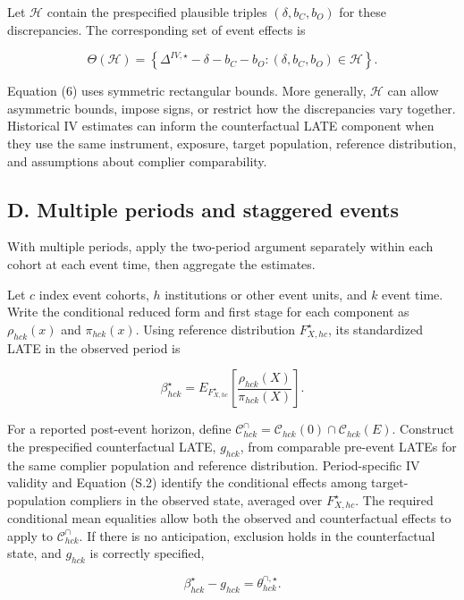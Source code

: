 \documentclass[
  11pt,
]{article}
\begin{document}
Let \(\mathcal H\) contain the prespecified plausible triples
\((\delta,b_C,b_O)\) for these discrepancies. The corresponding set of
event effects is

\[
\Theta(\mathcal H)
=\left\{
\Delta^{IV,\star}-\delta-b_C-b_O:
(\delta,b_C,b_O)\in\mathcal H
\right\}.
\tag{S.9}
\]

Equation (6) uses symmetric rectangular bounds. More generally,
\(\mathcal H\) can allow asymmetric bounds, impose signs, or restrict
how the discrepancies vary together. Historical IV estimates can inform
the counterfactual LATE component when they use the same instrument,
exposure, target population, reference distribution, and assumptions
about complier comparability.

\hypertarget{d.-multiple-periods-and-staggered-events}{%
\subsection{D. Multiple periods and staggered
events}\label{d.-multiple-periods-and-staggered-events}}

With multiple periods, apply the two-period argument separately within
each cohort at each event time, then aggregate the estimates.

Let \(c\) index event cohorts, \(h\) institutions or other event units,
and \(k\) event time. Write the conditional reduced form and first stage
for each component as \(\rho_{hck}(x)\) and \(\pi_{hck}(x)\). Using
reference distribution \(F_{X,hc}^\star\), its standardized LATE in the
observed period is

\[
\beta_{hck}^\star
=E_{F_{X,hc}^\star}\!\left[
\frac{\rho_{hck}(X)}{\pi_{hck}(X)}
\right].
\tag{S.10}
\]

For a reported post-event horizon, define
\(\mathcal C_{hck}^\cap=\mathcal C_{hck}(0)\cap\mathcal C_{hck}(E)\).
Construct the prespecified counterfactual LATE, \(g_{hck}\), from
comparable pre-event LATEs for the same complier population and
reference distribution. Period-specific IV validity and Equation (S.2)
identify the conditional effects among target-population compliers in
the observed state, averaged over \(F_{X,hc}^\star\). The required
conditional mean equalities allow both the observed and counterfactual
effects to apply to \(\mathcal C_{hck}^\cap\). If there is no
anticipation, exclusion holds in the counterfactual state, and
\(g_{hck}\) is correctly specified,

\[
\beta_{hck}^\star-g_{hck}
=\theta_{hck}^{\cap,\star}.
\tag{S.11}
\]
\end{document}
